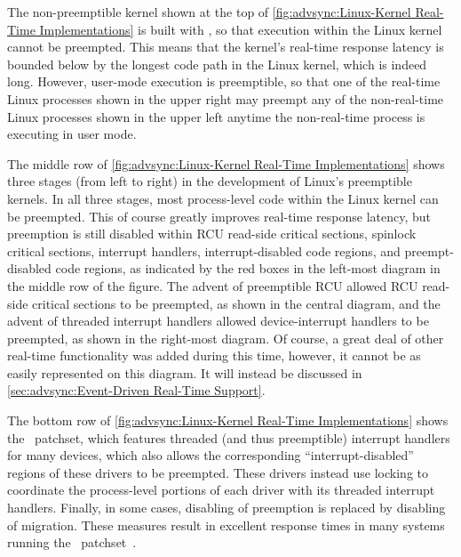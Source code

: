 The non-preemptible kernel shown at the top of
\cref{fig:advsync:Linux-Kernel Real-Time Implementations}
is built with , so that execution within the Linux
kernel cannot be preempted.
This means that the kernel's real-time response latency is bounded below
by the longest code path in the Linux kernel, which is indeed long.
However, user-mode execution is preemptible, so that one of the
real-time Linux processes shown in the upper right may preempt any of the
non-real-time Linux processes shown in the upper left anytime the
non-real-time process is executing in user mode.

The middle row of
\cref{fig:advsync:Linux-Kernel Real-Time Implementations}
shows three stages (from left to right) in the development of Linux's
preemptible kernels.
In all three stages, most process-level code within the Linux kernel
can be preempted.
This of course greatly improves real-time response latency, but
preemption is still disabled
within RCU read-side critical sections,
spinlock critical sections,
interrupt handlers,
interrupt-disabled code regions, and
preempt-disabled code regions, as indicated by the red boxes in the
left-most diagram in the middle row of the figure.
The advent of preemptible RCU allowed RCU read-side critical sections
to be preempted, as shown in the central diagram,
and the advent of threaded interrupt handlers allowed device-interrupt
handlers to be preempted, as shown in the right-most diagram.
Of course, a great deal of other real-time functionality was added
during this time, however, it cannot be as easily represented on this
diagram.
It will instead be discussed in
\cref{sec:advsync:Event-Driven Real-Time Support}.

The bottom row of
\cref{fig:advsync:Linux-Kernel Real-Time Implementations}
shows the \rt\ patchset, which features threaded (and thus preemptible)
interrupt handlers for many devices, which also allows the corresponding
``interrupt-disabled'' regions of these drivers to be preempted.
These drivers instead use locking to coordinate the process-level
portions of each driver with its threaded interrupt handlers.
Finally, in some cases, disabling of preemption is replaced by
disabling of migration.
These measures result in excellent response times in many systems running
the \rt\ patchset~\cite{Reghenzani:2019:RLK:3309872.3297714,DanielBristot2019RTtrace}.


